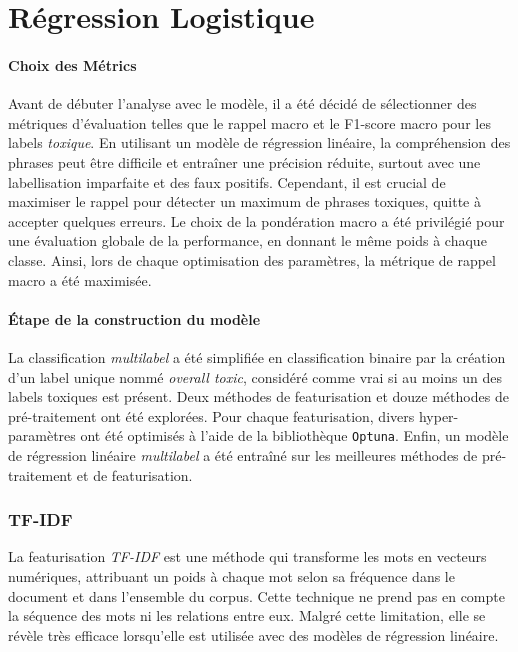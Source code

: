 \chapter{Régression Logistique}

\subsubsection{Choix des Métrics}
Avant de débuter l'analyse avec le modèle, il a été décidé de sélectionner des métriques d'évaluation telles que le rappel macro et le F1-score macro pour les labels \textit{toxique}.
En utilisant un modèle de régression linéaire, la compréhension des phrases peut être difficile et entraîner une précision réduite, surtout avec une labellisation imparfaite et des faux positifs.
Cependant, il est crucial de maximiser le rappel pour détecter un maximum de phrases toxiques, quitte à accepter quelques erreurs. Le choix de la pondération macro a été privilégié pour une évaluation globale de la performance, en donnant le même poids à chaque classe.
Ainsi, lors de chaque optimisation des paramètres, la métrique de rappel macro a été maximisée.


\subsubsection{Étape de la construction du modèle}
La classification \textit{multilabel} a été simplifiée en classification binaire par la création d'un label unique nommé \textit{overall toxic}, considéré comme vrai si au moins un des labels toxiques est présent.
Deux méthodes de featurisation et douze méthodes de pré-traitement ont été explorées.
Pour chaque featurisation, divers hyper-paramètres ont été optimisés à l'aide de la bibliothèque \texttt{Optuna}. 
Enfin, un modèle de régression linéaire \textit{multilabel} a été entraîné sur les meilleures méthodes de pré-traitement et de featurisation.

\subsection{TF-IDF}
La featurisation \textit{TF-IDF} est une méthode qui transforme les mots en vecteurs numériques, attribuant un poids à chaque mot selon sa fréquence dans le document et dans l'ensemble du corpus.
Cette technique ne prend pas en compte la séquence des mots ni les relations entre eux. Malgré cette limitation, elle se révèle très efficace lorsqu'elle est utilisée avec des modèles de régression linéaire.

